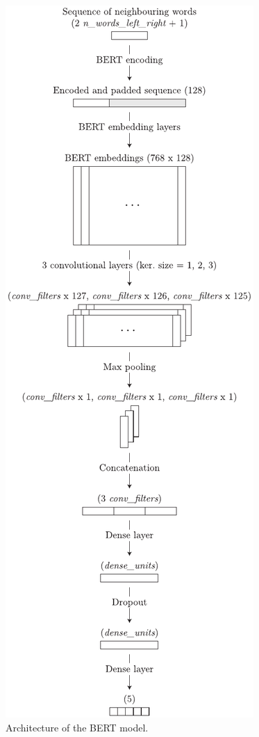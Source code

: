 \documentclass[11pt,a4paper]{article}
\begin{document}
\begin{figure}[h!]
\centering
\includegraphics[width=1.0\columnwidth]{bert-model.pdf}
\caption{Architecture of the BERT model.}
\label{fig:bert-model}
\end{figure}
\end{document}
